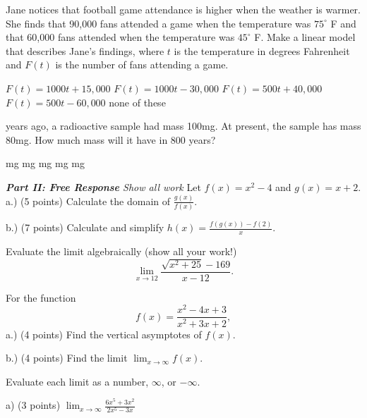 \documentclass[11pt]{article}
\begin{document}
\begin{questions}
\begin{multiplechoice}{5}
\question Jane notices that football game attendance is higher when the weather is warmer.  She finds that 90,000 fans attended a game when the temperature was $75^\circ$ F and that 60,000 fans attended when the temperature was $45^\circ$ F.  Make a linear model that describes Jane's findings, where $t$ is the temperature in degrees Fahrenheit and $F(t)$ is the number of fans attending a game.
\begin{answers}{3}
\ans $F(t) = 1000t+15,000$
\ans $F(t) = 1000t-30,000$
\ans $F(t) = 500t+40,000$
\ans $F(t) = 500t - 60,000$
\ans none of these
\end{answers}

 years ago, a radioactive sample had mass 100mg.  At present, the sample has mass 80mg.  How much mass will it have in 800 years?
\begin{answers}{2}
 mg
 mg %
 mg
 mg
 mg
\end{answers}


\end{multiplechoice}
\vspace{.2in}

\nextpage
\noindent \emph{{\bf Part II: Free Response}{  Show all work}}
\question[12] Let $f(x)=x^2-4$ and $g(x) = x+2$.\\

a.) (5 points) Calculate the domain of $\frac{g(x)}{f(x)}$.
\vspace{1.25in}

b.) (7 points) Calculate and simplify $h(x) = \frac{f(g(x))-f(2)}{x}$.
\vspace{2.25in}




\question[10] Evaluate the limit algebraically (show all your work!)
\[\lim_{x\to 12} \frac{\sqrt{x^2+25} - 169}{x-12}.\]
\vspace{3.25in}

\question[8] For the function 
\[f(x) = \frac{x^2-4x+3}{x^2+3x+2},\]
a.) (4 points) Find the vertical asymptotes of $f(x)$.
\vspace{2.25in}

b.) (4 points) Find the limit $\lim_{x\to \infty} f(x)$.
\vspace{2.25in}

\question[15] Evaluate each limit as a number, $\infty$, or $-\infty$.

a) (3 points) $\displaystyle \lim_{x\to\infty} \frac{6x^5 + 3x^2}{2x^5 - 3x}$

\vspace{1.25in}


\end{questions}
\end{document}
